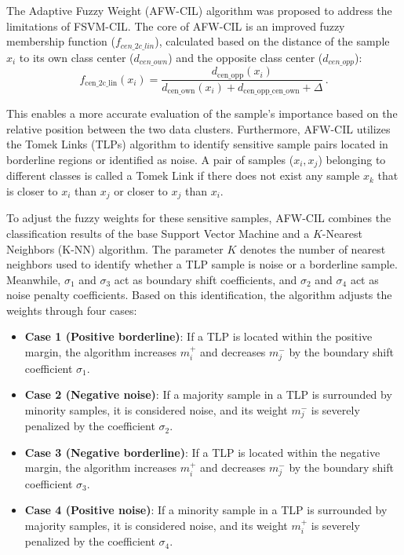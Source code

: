 \documentclass[pdflatex,sn-mathphys-num]{sn-jnl}%
\theoremstyle{thmstyleone}%
\theoremstyle{thmstyletwo}
\theoremstyle{thmstylethree}
\begin{document}
The Adaptive Fuzzy Weight (AFW-CIL) algorithm \cite{quang2023adaptive} was proposed to address the limitations of FSVM-CIL. The core of AFW-CIL is an improved fuzzy membership function ($f_{cen\_2c\_lin}$), calculated based on the distance of the sample $x_i$ to its own class center ($d_{cen\_own}$) and the opposite class center ($d_{cen\_opp}$):
\begin{equation} \label{eq:fcen2clin}
    f_{\mathrm{cen\_2c\_lin}}(x_i) = \frac{d_{\mathrm{cen\_opp}}(x_i)}{d_{\mathrm{cen\_own}}(x_i) + d_{\mathrm{cen\_opp\_cen\_own}} + \Delta} \,.
\end{equation}

This enables a more accurate evaluation of the sample's importance based on the relative position between the two data clusters. Furthermore, AFW-CIL utilizes the Tomek Links (TLPs) algorithm \cite{tomek1976two} to identify sensitive sample pairs located in borderline regions or identified as noise. A pair of samples ($x_i, x_j$) belonging to different classes is called a Tomek Link if there does not exist any sample $x_k$ that is closer to $x_i$ than $x_j$ or closer to $x_j$ than $x_i$. 

To adjust the fuzzy weights for these sensitive samples, AFW-CIL combines the classification results of the base Support Vector Machine and a $K$-Nearest Neighbors (K-NN) algorithm. The parameter $K$ denotes the number of nearest neighbors used to identify whether a TLP sample is noise or a borderline sample. Meanwhile, $\sigma_1$ and $\sigma_3$ act as boundary shift coefficients, and $\sigma_2$ and $\sigma_4$ act as noise penalty coefficients. Based on this identification, the algorithm adjusts the weights through four cases:
\begin{itemize}
    \item \textbf{Case 1 (Positive borderline)}: If a TLP is located within the positive margin, the algorithm increases $m_i^+$ and decreases $m_j^-$ by the boundary shift coefficient $\sigma_1$.
    \item \textbf{Case 2 (Negative noise)}: If a majority sample in a TLP is surrounded by minority samples, it is considered noise, and its weight $m_j^-$ is severely penalized by the coefficient $\sigma_2$.
    \item \textbf{Case 3 (Negative borderline)}: If a TLP is located within the negative margin, the algorithm increases $m_i^+$ and decreases $m_j^-$ by the boundary shift coefficient $\sigma_3$.
    \item \textbf{Case 4 (Positive noise)}: If a minority sample in a TLP is surrounded by majority samples, it is considered noise, and its weight $m_i^+$ is severely penalized by the coefficient $\sigma_4$.
\end{itemize}
\end{document}
